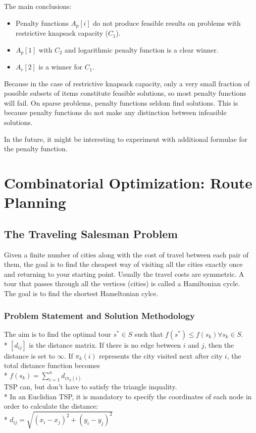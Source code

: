 \documentclass[12pt]{book}
\newcounter{subsubsubsection}[subsubsection]
\begin{document}
The main conclusions:
\begin{itemize}
\item Penalty functions $A_p[i]$ do not produce feasible results on problems with restrictive knapsack capacity ($C_1$).
\item $A_p[1]$ with $C_2$ and logarithmic penalty function is a clear winner.
\item $A_r[2]$ is a winner for $C_1$.
\end{itemize}
Because in the case of restrictive knapsack capacity, only a very small fraction of possible subsets of items constitute feasible solutions, so most penalty functions will fail. On sparse problems, penalty functions seldom find solutions. This is because penalty functions do not make any distinction between infeasible solutions.

In the future, it might be interesting to experiment with additional formulae for the penalty function.
\clearpage

\setcounter{section}{7}
\chapter{Combinatorial Optimization: Route Planning}
\section{The Traveling Salesman Problem}
Given a finite number of cities along with the cost of travel between each pair of them, the goal is to find the cheapest way of visiting all the cities exactly once and returning to your starting point. Usually the travel costs are symmetric. A tour that passes through all the vertices (cities) is called a Hamiltonian cycle. The goal is to find the shortest Hameltonian cylce.
\subsection{Problem Statement and Solution Methodology}
The aim is to find the optimal tour $s^* \in S$ such that $f(s^*) \leq f(s_k) \forall s_k \in S$.\\*
$[d_{ij}]$ is the distance matrix. If there is no edge between $i$ and $j$, then the distance is set to $\infty$. If $\pi_k(i)$ represents the city visited next after city $i$, the total distance function becomes\\*
$f(s_k) = \sum_{i=1}^nd_{i\pi_k(i)}$\\
TSP can, but don't have to satisfy the triangle inquality.\\*
In an Euclidian TSP, it is mandatory to specify the coordinates of each node in order to calculate the distance:\\*
$d_{ij} = \sqrt{(x_i-x_j)^2 + (y_i - y_j)^2}$
\end{document}
